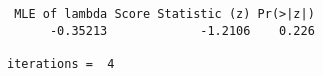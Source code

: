 \begin{verbatim} MLE of lambda Score Statistic (z) Pr(>|z|)
      -0.35213             -1.2106    0.226

iterations =  4 
\end{verbatim}